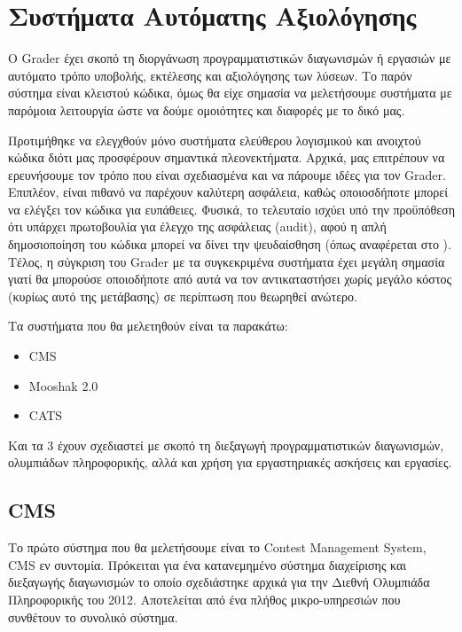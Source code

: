 \documentclass[diploma]{softlab-thesis}
\begin{document}
\chapter{Συστήματα Αυτόματης Αξιολόγησης}

O Grader έχει σκοπό τη διοργάνωση προγραμματιστικών διαγωνισμών ή εργασιών
με αυτόματο τρόπο υποβολής, εκτέλεσης και αξιολόγησης των λύσεων. Το παρόν
σύστημα είναι κλειστού κώδικα, όμως θα είχε σημασία να μελετήσουμε συστήματα
με παρόμοια λειτουργία ώστε να δούμε ομοιότητες και διαφορές με το δικό μας.

\bigskip

Προτιμήθηκε να ελεγχθούν μόνο συστήματα ελεύθερου λογισμικού και ανοιχτού
κώδικα διότι μας προσφέρουν σημαντικά πλεονεκτήματα. Αρχικά, μας επιτρέπουν να
ερευνήσουμε τον τρόπο που είναι σχεδιασμένα και να πάρουμε ιδέες για τον
Grader. Επιπλέον, είναι πιθανό να παρέχουν καλύτερη ασφάλεια, καθώς
οποιοσδήποτε μπορεί να ελέγξει τον κώδικα για ευπάθειες. Φυσικά, το τελευταίο
ισχύει υπό την προϋπόθεση ότι υπάρχει πρωτοβουλία για έλεγχο της ασφάλειας
(audit), αφού η απλή δημοσιοποίηση του κώδικα μπορεί να δίνει την ψευδαίσθηση
(όπως αναφέρεται στο \cite{hansen2002open}). Τέλος, η σύγκριση του Grader με τα
συγκεκριμένα συστήματα έχει μεγάλη σημασία γιατί θα μπορούσε οποιοδήποτε από
αυτά να τον αντικαταστήσει χωρίς μεγάλο κόστος (κυρίως αυτό της μετάβασης) σε
περίπτωση που θεωρηθεί ανώτερο.

\bigskip

Τα συστήματα που θα μελετηθούν είναι τα παρακάτω:

\begin{itemize}
    \setlength\itemsep{0em}
    \item CMS
    \item Mooshak 2.0
    \item CATS
\end{itemize}

Και τα 3 έχουν σχεδιαστεί με σκοπό τη διεξαγωγή προγραμματιστικών διαγωνισμών,
ολυμπιάδων πληροφορικής, αλλά και χρήση για εργαστηριακές ασκήσεις και
εργασίες.

\section{CMS}

Το πρώτο σύστημα που θα μελετήσουμε είναι το Contest Management System, CMS εν
συντομία. Πρόκειται για ένα κατανεμημένο σύστημα διαχείρισης και διεξαγωγής
διαγωνισμών το οποίο σχεδιάστηκε αρχικά για την Διεθνή Ολυμπιάδα Πληροφορικής
του 2012. Αποτελείται από ένα πλήθος μικρο-υπηρεσιών που συνθέτουν το συνολικό
σύστημα.
\end{document}
